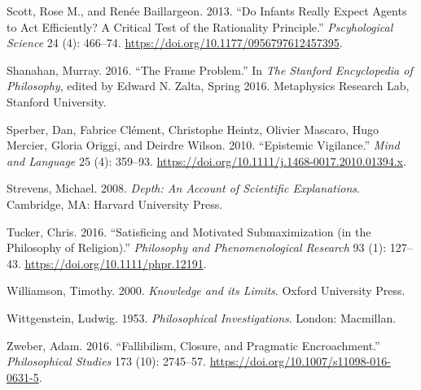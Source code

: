 \documentclass[
  11pt,
  letterpaper,
  DIV=11,
  numbers=noendperiod,
  oneside]{scrartcl}
\newlength{\cslhangindent}
\newenvironment{CSLReferences}[2] %
 {\begin{list}{}{%
  \setlength{\itemindent}{0pt}
  \setlength{\leftmargin}{0pt}
  \setlength{\parsep}{0pt}
  \ifodd #1
   \setlength{\leftmargin}{\cslhangindent}
   \setlength{\itemindent}{-1\cslhangindent}
  \fi
  \setlength{\itemsep}{#2\baselineskip}}}
 {\end{list}}
\begin{document}
\begin{CSLReferences}{1}{0}
Scott, Rose M., and Renée Baillargeon. 2013. {``Do Infants Really Expect
Agents to Act Efficiently? A Critical Test of the Rationality
Principle.''} \emph{Pscyhological Science} 24 (4): 466--74.
\url{https://doi.org/10.1177/0956797612457395}.

Shanahan, Murray. 2016. {``The Frame Problem.''} In \emph{The Stanford
Encyclopedia of Philosophy}, edited by Edward N. Zalta, Spring 2016.
Metaphysics Research Lab, Stanford University.

Sperber, Dan, Fabrice Clément, Christophe Heintz, Olivier Mascaro, Hugo
Mercier, Gloria Origgi, and Deirdre Wilson. 2010. {``Epistemic
Vigilance.''} \emph{Mind and Language} 25 (4): 359--93.
\url{https://doi.org/10.1111/j.1468-0017.2010.01394.x}.

Strevens, Michael. 2008. \emph{Depth: An Account of Scientific
Explanations}. Cambridge, MA: Harvard University Press.

Tucker, Chris. 2016. {``Satisficing and Motivated Submaximization (in
the Philosophy of Religion).''} \emph{Philosophy and Phenomenological
Research} 93 (1): 127--43. \url{https://doi.org/10.1111/phpr.12191}.

Williamson, Timothy. 2000. \emph{{Knowledge and its Limits}}. Oxford
University Press.

Wittgenstein, Ludwig. 1953. \emph{Philosophical Investigations}. London:
Macmillan.

Zweber, Adam. 2016. {``Fallibilism, Closure, and Pragmatic
Encroachment.''} \emph{Philosophical Studies} 173 (10): 2745--57.
\url{https://doi.org/10.1007/s11098-016-0631-5}.

\end{CSLReferences}
\end{document}
